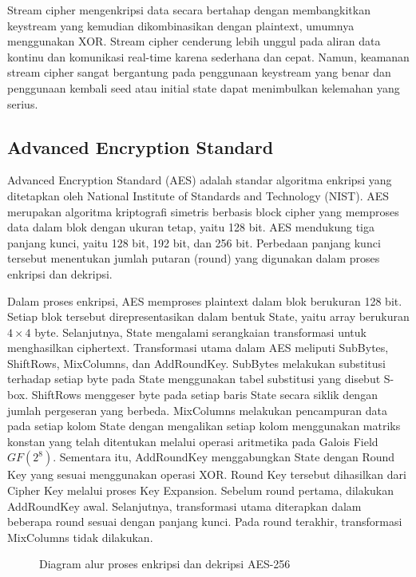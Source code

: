 Stream cipher mengenkripsi data secara bertahap dengan membangkitkan keystream yang kemudian dikombinasikan dengan plaintext, umumnya menggunakan XOR\cite{}. Stream cipher cenderung lebih unggul pada aliran data kontinu dan komunikasi real-time karena sederhana dan cepat\cite{}. Namun, keamanan stream cipher sangat bergantung pada penggunaan keystream yang benar dan penggunaan kembali seed atau initial state dapat menimbulkan kelemahan yang serius\cite{}.

\subsection{Advanced Encryption Standard}
Advanced Encryption Standard (AES) adalah standar algoritma enkripsi yang ditetapkan oleh National Institute of Standards and Technology (NIST)\cite{Rahma2022Proposed}. AES merupakan algoritma kriptografi simetris berbasis block cipher yang memproses data dalam blok dengan ukuran tetap, yaitu 128 bit. AES mendukung tiga panjang kunci, yaitu 128 bit, 192 bit, dan 256 bit. Perbedaan panjang kunci tersebut menentukan jumlah putaran (round) yang digunakan dalam proses enkripsi dan dekripsi\cite{Spoorthy2025Design}.

Dalam proses enkripsi, AES memproses plaintext dalam blok berukuran 128 bit. Setiap blok tersebut direpresentasikan dalam bentuk State, yaitu array berukuran $4 \times 4$ byte\cite{Shazhaq2023Analisa}. Selanjutnya, State mengalami serangkaian transformasi untuk menghasilkan ciphertext. Transformasi utama dalam AES meliputi SubBytes, ShiftRows, MixColumns, dan AddRoundKey. SubBytes melakukan substitusi terhadap setiap byte pada State menggunakan tabel substitusi yang disebut S-box. ShiftRows menggeser byte pada setiap baris State secara siklik dengan jumlah pergeseran yang berbeda. MixColumns melakukan pencampuran data pada setiap kolom State dengan mengalikan setiap kolom menggunakan matriks konstan yang telah ditentukan melalui operasi aritmetika pada Galois Field $GF(2^8)$. Sementara itu, AddRoundKey menggabungkan State dengan Round Key yang sesuai menggunakan operasi XOR. Round Key tersebut dihasilkan dari Cipher Key melalui proses Key Expansion. Sebelum round pertama, dilakukan AddRoundKey awal. Selanjutnya, transformasi utama diterapkan dalam beberapa round sesuai dengan panjang kunci. Pada round terakhir, transformasi MixColumns tidak dilakukan\cite{Taufiqqurrachman2022Security}.

\begin{figure}[H]
    \centering
    
    \caption{Diagram alur proses enkripsi dan dekripsi AES-256}
    \label{fig:aes-256}
\end{figure}


